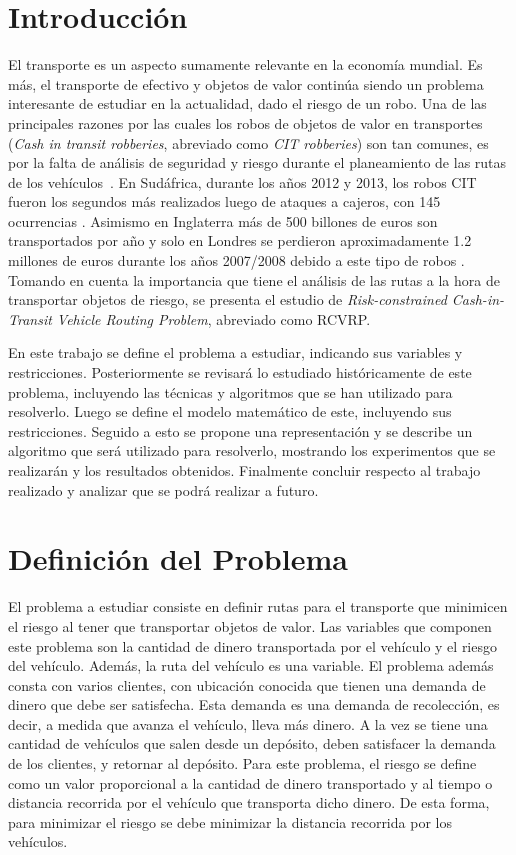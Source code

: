 \documentclass{article}
\begin{document}
\section{Introducci\'on}
El transporte es un aspecto sumamente relevante en la economía mundial. Es más, el transporte de efectivo y objetos de valor continúa siendo un problema interesante de estudiar en la actualidad, dado el riesgo de un robo. Una de las principales razones por las cuales los robos de objetos de valor en transportes (\textit{Cash in transit robberies}, abreviado como \textit{CIT robberies}) son tan comunes, es por la falta de análisis de seguridad y riesgo durante el planeamiento de las rutas de los vehículos~\cite{hepenstal2010concentration}. En Sudáfrica, durante los años 2012 y 2013, los robos CIT fueron los segundos más realizados luego de ataques a cajeros, con 145 ocurrencias \cite{thobane2014criminal}. Asimismo en Inglaterra más de 500 billones de euros son transportados por año \cite{talarico2015metaheuristics} y solo en Londres se perdieron aproximadamente 1.2 millones de euros durante los años 2007/2008 debido a este tipo de robos \cite{hepenstal2010concentration}. Tomando en cuenta la importancia que tiene el análisis de las rutas a la hora de transportar objetos de riesgo, se presenta el estudio de \textit{Risk-constrained Cash-in-Transit Vehicle Routing Problem}, abreviado como RCVRP. 

En este trabajo se define el problema a estudiar, indicando sus variables y restricciones. Posteriormente se revisará lo estudiado históricamente de este problema, incluyendo las técnicas y algoritmos que se han utilizado para resolverlo. Luego se define el modelo matemático de este, incluyendo sus restricciones. Seguido a esto se propone una representación y se describe un algoritmo que será utilizado para resolverlo, mostrando los experimentos que se realizarán y los resultados obtenidos. Finalmente concluir respecto al trabajo realizado y analizar que se podrá realizar a futuro.

\section{Definici\'on del Problema}
El problema a estudiar consiste en definir rutas para el transporte que minimicen el riesgo al tener que transportar objetos de valor. Las variables que componen este problema son la cantidad de dinero transportada por el vehículo y el riesgo del vehículo. Además, la ruta del vehículo es una variable. El problema además consta con varios clientes, con ubicación conocida que tienen una demanda de dinero que debe ser satisfecha. Esta demanda es una demanda de recolección, es decir, a medida que avanza el vehículo, lleva más dinero. A la vez se tiene una cantidad de vehículos que salen desde un depósito, deben satisfacer la demanda de los clientes, y retornar al depósito. Para este problema, el riesgo se define como un valor proporcional a la cantidad de dinero transportado y al tiempo o distancia recorrida por el vehículo que transporta dicho dinero. De esta forma, para minimizar el riesgo se debe minimizar la distancia recorrida por los vehículos. 
\end{document}
